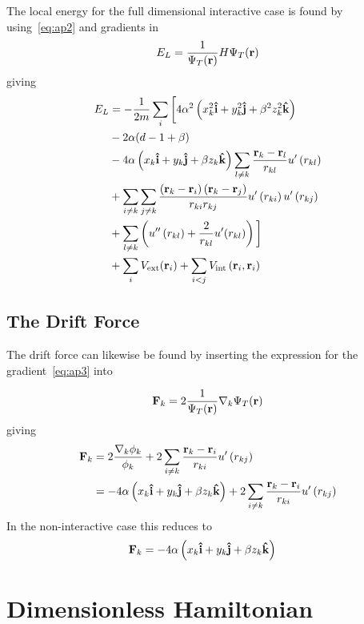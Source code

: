 The local energy for the full dimensional interactive case is found by
using~\eqref{eq:ap2} and gradients in
\begin{align*}
  E_{L} = \frac{1}{\Psi_T(\vb{r})}H\Psi_T(\vb{r})
\end{align*}
giving
\begin{align*}
  E_{L} &= -\frac{1}{2m}\sum_{i}\bigg[4\alpha^{2}\left(  x_{k}^{2}\uvec{i} + y_{k}^{2}\uvec{j} + \beta^{2} z_{k}^{2}\uvec{k}  \right)\\
          &-2\alpha(d-1+\beta)\\
        &- 4\alpha\left(  x_{k}\uvec{i} + y_{k}\uvec{j} + \beta z_{k}\uvec{k}  \right)
          \sum_{l\neq k} \frac{\vb{r}_{k}-\vb{r}_{l}}{r_{kl}}u^{\prime}\left( r_{kl} \right)\\
        &+ \sum_{i\neq k}\sum_{j\neq k}\frac{\left( \vb{r}_{k}-\vb{r}_{i} \right)\left( \vb{r}_{k} -\vb{r}_{j} \right)}{r_{ki}r_{kj}}u^{\prime}\left( r_{ki} \right)u^{\prime}\left( r_{kj} \right)\\
        &+ \sum_{l\neq k} \left( u^{\prime\prime}\left( r_{kl} \right)  + \frac{2}{r_{kl}}u^{\prime}(r_{kl})\right)\bigg]\\
        &+ \sum_{i}V_{\text{ext}}(\vb{r}_{i}) + \sum_{i<j}V_{\text{int}}\left( \vb{r}_{i}, \vb{r}_{i} \right)
\end{align*}
\subsection{The Drift Force}
The drift force can likewise be found by inserting the expression for the
gradient~\eqref{eq:ap3} into

\begin{align*}
  \vb{F}_{k} = 2\frac{1}{\Psi_T(\vb{r})}\nabla_{k}\Psi_T(\vb{r})
\end{align*}
giving
\begin{align*}
  \vb{F}_{k} &= 2 \frac{\nabla_{k}\phi_{k}}{\phi_{k}} + 2\sum_{i\neq k}\frac{\vb{r}_{k}-\vb{r}_{i}}{r_{ki}}u^{\prime}\left( r_{kj} \right)\\
             &= -4\alpha\left(   x_{k}\uvec{i} + y_{k}\uvec{j} + \beta z_{k}\uvec{k}   \right) + 2\sum_{i\neq k} \frac{\vb{r}_{k}-\vb{r}_{i}}{r_{ki}}u^{\prime}\left( r_{kj} \right)\\
\end{align*}
In the non-interactive case this reduces to
\begin{align*}
  \vb{F}_{k} &= -4\alpha\left(   x_{k}\uvec{i} + y_{k}\uvec{j} + \beta z_{k}\uvec{k}   \right)
\end{align*}



\section{Dimensionless Hamiltonian}\label{appendix:dimhamiltonian}
